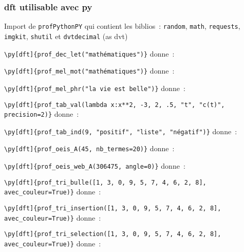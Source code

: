 \documentclass{article}
\begin{document}
\subsubsection{dft utilisable avec py}
Import de \texttt{profPythonPY} qui contient les biblios~:
\texttt{random}, \texttt{math}, \texttt{requests}, \texttt{imgkit},
\texttt{shutil} et \texttt{dvtdecimal} (as dvt)

\verb|\py[dft]{prof_dec_let("mathématiques")}| donne~:\\

\medskip
\verb|\py[dft]{prof_mel_mot("mathématiques")}| donne~:\\

\medskip
\verb|\py[dft]{prof_mel_phr("la vie est belle")}| donne~:\\

\medskip
\verb|\py[dft]{prof_tab_val(lambda x:x**2, -3, 2, .5, "t", "c(t)", precision=2)}| donne~:\\

\medskip
\verb|\py[dft]{prof_tab_ind(9, "positif", "liste", "négatif")}| donne~:\\

\medskip
\verb|\py[dft]{prof_oeis_A(45, nb_termes=20)}| donne~:\\

\medskip
\verb|\py[dft]{prof_oeis_web_A(306475, angle=0)}| donne~:\\

\medskip
\verb|\py[dft]{prof_tri_bulle([1, 3, 0, 9, 5, 7, 4, 6, 2, 8], avec_couleur=True)}| donne~:\\

\medskip
\verb|\py[dft]{prof_tri_insertion([1, 3, 0, 9, 5, 7, 4, 6, 2, 8], avec_couleur=True)}| donne~:\\

\medskip
\verb|\py[dft]{prof_tri_selection([1, 3, 0, 9, 5, 7, 4, 6, 2, 8], avec_couleur=True)}| donne~:\\
\end{document}
